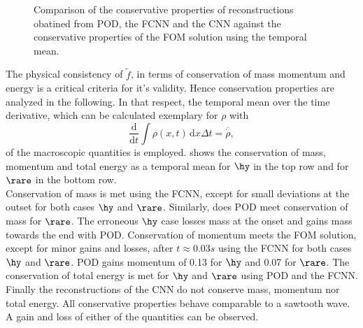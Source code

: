 \begin{figure}[H]
	
	\caption{Comparison of the conservative properties of reconstructions obatined from POD, the FCNN and the CNN against the conservative properties of the FOM solution using the temporal mean.}
	\label{Fig:Conservation}
\end{figure}
The physical consistency of \(\tilde{f}\), in terms of conservation of mass momentum and energy is a critical criteria for it's validity. Hence conservation properties are analyzed in the following. In that respect, the temporal mean over the time derivative, which can be calculated exemplary for \(\rho\) with
\begin{equation}
	\frac{\mathrm{d}}{\mathrm{d}t}\int \rho(x,t)\, \mathrm{d}x\Delta t  =\overline{\dot{\rho}}\mathrm{,}
\end{equation}
of the macroscopic quantities is employed.  shows the conservation of mass, momentum and total energy as a temporal mean for \(\hy\) in the top row and for \(\rare\) in the bottom row.\\
Conservation of mass is met using the FCNN, except for small deviations at the outset for both cases \(\hy\) and \(\rare\). Similarly, does POD meet conservation of mass for \(\rare\). The erroneous \(\hy\) case losses mass at the onset and gains mass towards the end with POD. Conservation of momentum meets the FOM solution, except for minor gains and losses, after \(t\approx 0.03s\) using the FCNN for both cases \(\hy\) and \(\rare\). POD gains momentum of 0.13 for \(\hy\) and 0.07 for \(\rare\). The conservation of total energy is met for \(\hy\) and \(\rare\) using POD and the FCNN. Finally the reconstructions of the CNN do not conserve mass, momentum nor total energy. All conservative properties behave comparable to a sawtooth wave. A gain and loss of either of the quantities can be observed.\\


